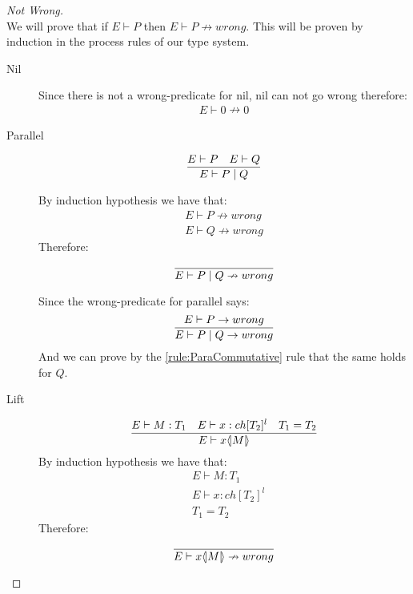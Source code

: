 \vspace{10mm}
\begin{proof}[Not Wrong]\\
	We will prove that if $E \vdash P$ then $E \vdash P \nrightarrow wrong$. This will be proven by induction in the process rules of our type system.
	\begin{description}
	\item[Nil]
		Since there is not a wrong-predicate for nil, nil can not go wrong therefore:
		\begin{align*}
		E \vdash 0 \nrightarrow 0
		\end{align*}
	\item[Parallel]
		\begin{align*}
		\frac{E \vdash P \quad E \vdash Q }{E \vdash P \mid Q}
		\end{align*}
		
		By induction hypothesis we have that: 
		\begin{align*}
		E \vdash P \nrightarrow wrong\\
		E \vdash Q \nrightarrow wrong
		\end{align*}
		Therefore:
		\begin{align*}
		\frac{}{E \vdash P \mid Q \nrightarrow wrong}
		\end{align*}
		
		Since the wrong-predicate for parallel says:
		\begin{align*}
		\frac{E \vdash P \rightarrow wrong}{E \vdash P \mid Q \rightarrow wrong}
		\end{align*}
		And we can prove by the \ref{rule:ParaCommutative} rule that the same holds for $Q$.
	\item[Lift]
		\begin{align*}
		\frac{E \vdash M:T_1 \quad E \vdash x:ch[T_2]^l \quad T_1 = T_2}{E \vdash x \langle \! | M | \! \rangle}
		\end{align*}
		By induction hypothesis we have that:
		\begin{align*}
		&E \vdash M:T_1\\
		&E \vdash x:ch[T_2]^l\\
		&T_1 = T_2
		\end{align*}
		Therefore:
		\begin{align*}
		\frac{}{E \vdash x \langle \! | M | \! \rangle \nrightarrow wrong}
		\end{align*}
		

\end{description}
\end{proof}
